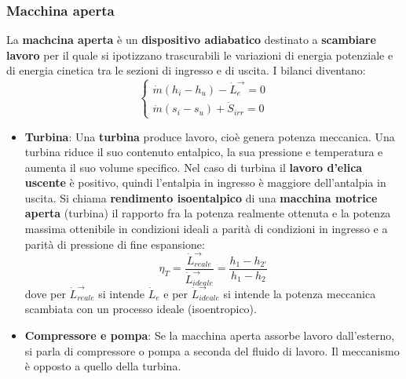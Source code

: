 \subsubsection{Macchina aperta}
La \textbf{machcina aperta} è un \textbf{dispositivo adiabatico} destinato a \textbf{scambiare lavoro} per il quale si ipotizzano trascurabili le variazioni di energia potenziale e di energia cinetica tra le sezioni di ingresso e di uscita.\newline
\newline
I bilanci diventano:
\[
    \begin{cases}
        \dot{m} (h_i - h_u) - \dot{L}_e^\rightarrow  = 0\\
        \dot{m} (s_i-s_u) + \dot{S}_{irr} = 0
    \end{cases}
\]
\begin{itemize}
    \item \textbf{Turbina}:\newline
    Una \textbf{turbina} produce lavoro, cioè genera potenza meccanica.\newline
    \newline
    Una turbina riduce il suo contenuto entalpico, la sua pressione e temperatura e aumenta il suo volume specifico.\newline
    \newline
    Nel caso di turbina il \textbf{lavoro d'elica uscente} è positivo, quindi l'entalpia in ingresso è maggiore dell'antalpia in uscita.\newline
    \newline
    Si chiama \textbf{rendimento isoentalpico} di una \textbf{macchina motrice aperta} (turbina) il rapporto fra la potenza realmente ottenuta e la potenza massima ottenibile in condizioni ideali a parità di condizioni in ingresso e a parità di pressione di fine espansione:
    \[
        \eta_T = \frac{\dot{L}_{reale}^\rightarrow }{\dot{L}_{ideale}^\rightarrow } = \frac{h_1 - h_{2'}}{h_1-h_2}
    \]
    dove per $\dot{L}_{reale}^\rightarrow $ si intende $\dot{L}_e$ e per $\dot{L}_{ideale}^\rightarrow $ si intende la potenza meccanica scambiata con un processo ideale (isoentropico).
    \item \textbf{Compressore e pompa}:\newline
    Se la macchina aperta assorbe lavoro dall'esterno, si parla di compressore o pompa a seconda del fluido di lavoro.\newline
    \newline
    Il meccanismo è opposto a quello della turbina.\newline

\end{itemize}
